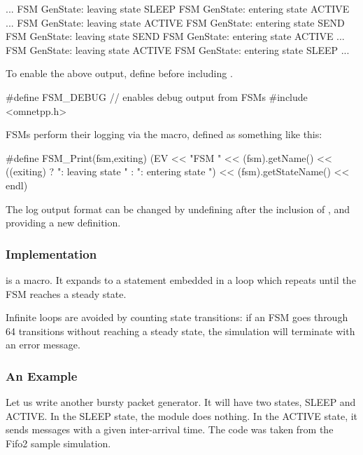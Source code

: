 \begin{filelisting}
...
FSM GenState: leaving state SLEEP
FSM GenState: entering state ACTIVE
...
FSM GenState: leaving state ACTIVE
FSM GenState: entering state SEND
FSM GenState: leaving state SEND
FSM GenState: entering state ACTIVE
...
FSM GenState: leaving state ACTIVE
FSM GenState: entering state SLEEP
...
\end{filelisting}

To enable the above output, define  before including .

\begin{cpp}
#define FSM_DEBUG    // enables debug output from FSMs
#include <omnetpp.h>
\end{cpp}

FSMs perform their logging via the  macro, defined as
something like this:

\begin{cpp}
#define FSM_Print(fsm,exiting)
  (EV << "FSM " << (fsm).getName()
      << ((exiting) ? ": leaving state " : ": entering state ")
      << (fsm).getStateName() << endl)
\end{cpp}

The log output format can be changed by undefining  after the
inclusion of , and providing a new definition.


\subsubsection{Implementation}
\label{sec:simple-modules:fsm-implementation}

 is a macro. It expands to a 
statement embedded in a  loop which repeats until the
FSM reaches a steady state.

Infinite loops are avoided by counting state transitions: if
an FSM goes through 64 transitions without reaching a steady
state, the simulation will terminate with an error message.


\subsubsection{An Example}
\label{sec:simple-modules:fsm-example}

Let us write another bursty packet generator. It will have two
states, SLEEP and ACTIVE. In the SLEEP state, the module does
nothing. In the ACTIVE state, it sends messages with a given
inter-arrival time. The code was taken from the Fifo2 sample
simulation.


